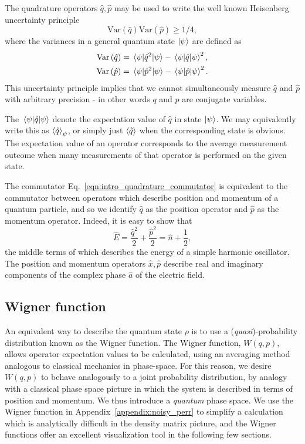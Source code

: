 \noindent The quadrature operators $\hat{q}, \hat{p}$ may be used to write the well known Heisenberg uncertainty principle 
\begin{equation}
\text{Var}\left(\hat{q}\right)\text{Var}\left(\hat{p}\right) \ge 1/4, %
\end{equation} 
where the variances in a general quantum state $\ket{\psi}$ are defined as
\begin{align}
\text{Var}\left(\hat{q}\right) &= \mel{\psi}{\hat{q}^2}{\psi} - \mel{\psi}{\hat{q}}{\psi}^2, \notag \\
\text{Var}\left(\hat{p}\right) &= \mel{\psi}{\hat{p}^2}{\psi} - \mel{\psi}{\hat{p}}{\psi}^2.
\end{align}
This uncertainty principle implies that we cannot simultaneously measure $\hat{q}$ and $\hat{p}$ with arbitrary precision - in other words $q$ and $p$ are conjugate variables.

The $\mel{\psi}{\hat{q}}{\psi}$ denote the expectation value of $\hat{q}$ in state $\ket{\psi}$. We may equivalently write this as $\ev{\hat{q}}_\psi$, or simply just $\ev{\hat{q}}$ when the corresponding state is obvious. The expectation value of an operator corresponds to the average measurement outcome when many measurements of that operator is performed on the given state.

\noindent The commutator Eq.~\ref{eqn:intro_quadrature_commutator} is equivalent to the commutator between operators which describe position and momentum of a quantum particle, and so we identify $\hat{q}$ as the position operator and $\hat{p}$ as the momentum operator. Indeed, it is easy to show that
\begin{equation}
\hat{E} = \frac{\hat{q}^2}{2} + \frac{\hat{p}^2}{2} = \hat{n} + \frac{1}{2} ,
\end{equation}
the middle terms of which describes the energy of a simple harmonic oscillator. The position and momentum operators $\hat{x}, \hat{p}$ describe real and imaginary components of the complex phase $\hat{a}$ of the electric field.





\FloatBarrier
\subsection{Wigner function}
An equivalent way to describe the quantum state $\rho$ is to use a (\emph{quasi})-probability distribution known as the Wigner function. The Wigner function, $W\left(q, p\right)$, allows operator expectation values to be calculated, using an averaging method analogous to classical mechanics in phase-space. For this reason, we desire $W\left(q, p\right)$ to behave analogously to a joint probability distribution, by analogy with a classical phase space picture in which the system is described in terms of position and momentum. We thus introduce a \emph{quantum} phase space. We use the Wigner function in Appendix~\ref{appendix:noisy_perr} to simplify a calculation which is analytically difficult in the density matrix picture, and the Wigner functions offer an excellent visualization tool in the following few sections.

